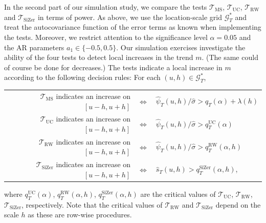In the second part of our simulation study, we compare the tests $\mathcal{T}_{\text{MS}}$, $\mathcal{T}_{\text{UC}}$, $\mathcal{T}_{\text{RW}}$ and $\mathcal{T}_{\text{SiZer}}$ in terms of power. As above, we use the location-scale grid $\mathcal{G}_T^*$ and treat the autocovariance function of the error terms as known when implementing the tests. Moreover, we restrict attention to the significance level $\alpha=0.05$ and the AR parameters $a_1 \in \{-0.5,0.5\}$. Our simulation exercises investigate the ability of the four tests to detect local increases in the trend $m$. (The same could of course be done for decreases.) The tests indicate a local increase in $m$ according to the following decision rules: For each $(u,h) \in \mathcal{G}_T^*$, 
\begin{center}
\begin{tabular}{rcl}
$\mathcal{T}_{\text{MS}}$ indicates an increase on $[u-h,u+h]$   & $\Longleftrightarrow$ & $\widehat{\psi}_T(u,h) / \widehat{\sigma} > q_T(\alpha) + \lambda(h)$ \\ 
$\mathcal{T}_{\text{UC}}$ indicates an increase on $[u-h,u+h]$   & $\Longleftrightarrow$ & $\widehat{\psi}_T(u,h) / \widehat{\sigma} > q_T^{\text{UC}}(\alpha)$ \\
$\mathcal{T}_{\text{RW}}$ indicates an increase on $[u-h,u+h]$   & $\Longleftrightarrow$ & $\widehat{\psi}_T(u,h) / \widehat{\sigma} > q_T^{\text{RW}}(\alpha,h)$ \\
$\mathcal{T}_{\text{SiZer}}$ indicates an increase on $[u-h,u+h]$ & $\Longleftrightarrow$ & $\widehat{s}_T(u,h) > q_T^{\text{SiZer}}(\alpha,h)$, 
\end{tabular}
\end{center}
where $q_T^{\text{UC}}(\alpha)$, $q_T^{\text{RW}}(\alpha,h)$, $q_T^{\text{SiZer}}(\alpha,h)$ are the critical values of $\mathcal{T}_{\text{UC}}$, $\mathcal{T}_{\text{RW}}$, $\mathcal{T}_{\text{SiZer}}$, respectively. Note that the critical values of $\mathcal{T}_{\text{RW}}$ and $\mathcal{T}_{\text{SiZer}}$ depend on the scale $h$ as these are row-wise procedures. 


